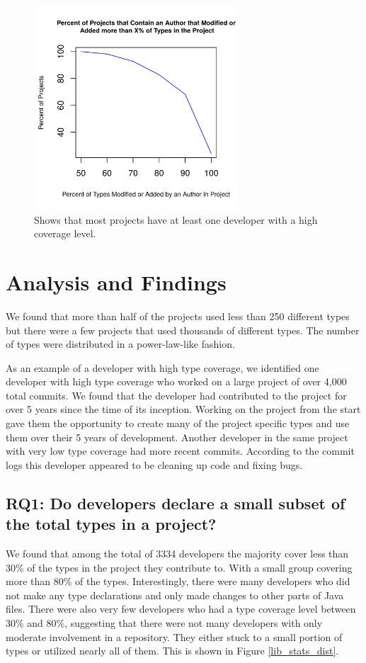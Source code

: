 \documentclass{sig-alternate-05-2015}
\begin{document}
\begin{figure}[t]
\centering
\includegraphics[height=3in, width=3in]{../lib_stats_count_authors_percent_per_project}
\caption{Shows that most projects have at least one developer with a high coverage level.}
\label{lib_stats_count_authors_percent_per_project}
\end{figure}

\section{Analysis and Findings}
We found that more than half of the projects used less than 250 different types but there were a few projects that used thousands of different types. The number of types were distributed in a power-law-like fashion.

As an example of a developer with high type coverage, we identified one developer with high type coverage who worked on a large project of over 4,000 total commits. We found that the developer had contributed to the project for over 5 years since the time of its inception. Working on the project from the start gave them the opportunity to create many of the project specific types and use them over their 5 years of development. Another developer in the same project with very low type coverage had more recent commits. According to the commit logs this developer appeared to be cleaning up code and fixing bugs.

\subsection{RQ1: Do developers declare a small subset of the total types in a project?}
We found that among the total of 3334 developers the majority cover less than 30\% of the types in the project they contribute to. With a small group covering more than 80\% of the types. Interestingly, there were many developers who did not make any type declarations and only made changes to other parts of Java files. There were also very few developers who had a type coverage level between 30\% and 80\%, suggesting that there were not many developers with only moderate involvement in a repository. They either stuck to a small portion of types or utilized nearly all of them. This is shown in Figure \ref{lib_stats_dist}.
\end{document}

